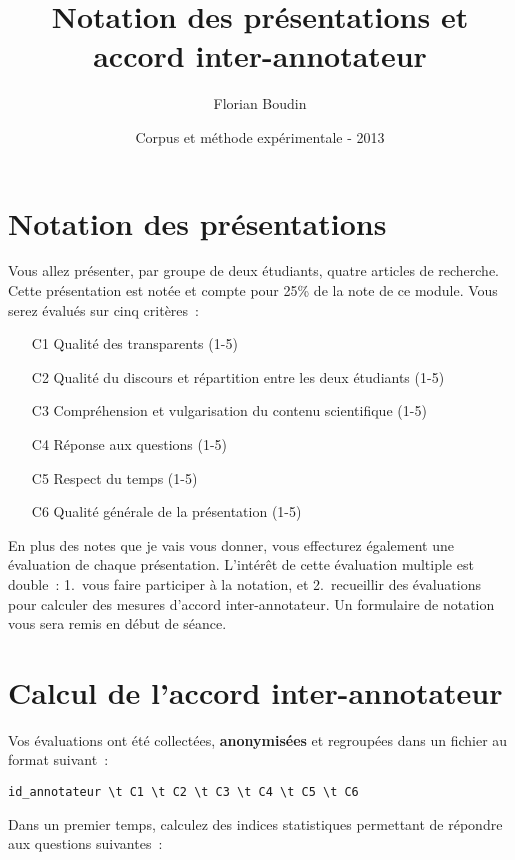 \documentclass[12pt,a4paper]{article}
\begin{document}
\title{Notation des présentations et accord inter-annotateur}
\author{Florian Boudin}
\date{Corpus et méthode expérimentale - 2013}

\maketitle

\section*{Notation des présentations}

Vous allez présenter, par groupe de deux étudiants, quatre articles de recherche.
Cette présentation est notée et compte pour 25\% de la note de ce module.
Vous serez évalués sur cinq critères~:

\begin{enumerate}
    \item[C1] Qualité des transparents (1-5)
    \item[C2] Qualité du discours et répartition entre les deux étudiants (1-5)
    \item[C3] Compréhension et vulgarisation du contenu scientifique (1-5)
    \item[C4] Réponse aux questions (1-5)
    \item[C5] Respect du temps (1-5)
    \item[C6] Qualité générale de la présentation (1-5)
\end{enumerate}

En plus des notes que je vais vous donner, vous effecturez également une évaluation de chaque présentation.
L'intérêt de cette évaluation multiple est double~: 1.~vous faire participer à la notation, et 2.~recueillir des évaluations pour calculer des mesures d'accord inter-annotateur.
Un formulaire de notation vous sera remis en début de séance.

\section*{Calcul de l'accord inter-annotateur}

Vos évaluations ont été collectées, \textbf{anonymisées} et regroupées dans un fichier au format suivant~:

\begin{verbatim}
id_annotateur \t C1 \t C2 \t C3 \t C4 \t C5 \t C6
\end{verbatim}

Dans un premier temps, calculez des indices statistiques permettant de répondre aux questions suivantes~:
\end{document}
